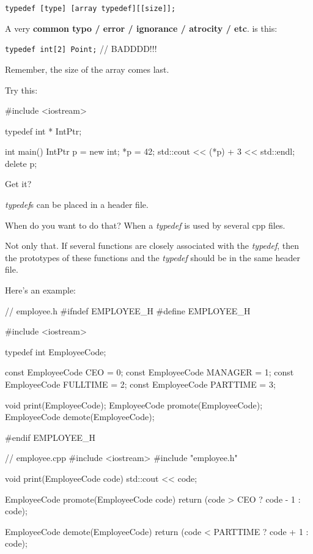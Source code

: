 \verb!typedef [type] [array typedef][[size]];!

A very \textbf{common typo / error / ignorance / atrocity / etc}. is
this:

\verb!typedef int[2] Point;! // BADDDD!!!

Remember, the size of the array comes last.



\newpage{}

Try this:

\begin{consolethree}[escapeinside=||]
#include <iostream>

typedef int * IntPtr;

int main()
{
    IntPtr p = new int;
    *p = 42;
    std::cout << (*p) + 3 << std::endl;
    delete p;
}
\end{consolethree}

Get it?





\newpage{}

\textit{typedef}s can be placed in a header file.

When do you want to do that? When a \textit{typedef} is used by several
cpp files.

Not only that. If several functions are closely associated with the
\textit{typedef}, then the prototypes of these functions and the
\textit{typedef} should be in the same header file.

Here's an example:

\begin{consolethree}[escapeinside=||]
// employee.h
#ifndef EMPLOYEE_H
#define EMPLOYEE_H

#include <iostream>

typedef int EmployeeCode;

const EmployeeCode CEO = 0;
const EmployeeCode MANAGER = 1;
const EmployeeCode FULLTIME = 2;
const EmployeeCode PARTTIME = 3;

void print(EmployeeCode);
EmployeeCode promote(EmployeeCode);
EmployeeCode demote(EmployeeCode);

#endif EMPLOYEE_H
\end{consolethree}

\begin{consolethree}[escapeinside=||]
// employee.cpp
#include <iostream>
#include "employee.h"

void print(EmployeeCode code)
{
    std::cout << code;
}

EmployeeCode promote(EmployeeCode code)
{
    return (code > CEO ? code - 1 : code);
}

EmployeeCode demote(EmployeeCode)
{
    return (code < PARTTIME ? code + 1 : code);
}
\end{consolethree}


